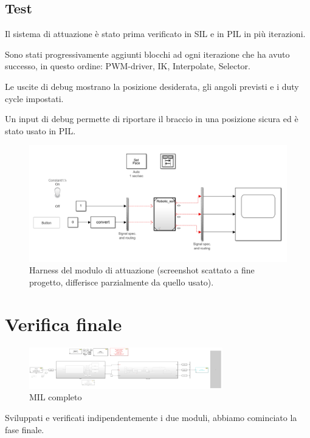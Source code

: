 \documentclass[12pt]{report}
\begin{document}
\section{Test}

Il sistema di attuazione è stato prima verificato in SIL e in PIL in più iterazioni.

Sono stati progressivamente aggiunti blocchi ad ogni iterazione che ha avuto successo, in questo ordine: PWM-driver, IK, Interpolate, Selector.

Le uscite di debug mostrano la posizione desiderata, gli angoli previsti e i duty cycle impostati.

Un input di debug permette di riportare il braccio in una posizione sicura ed è stato usato in PIL.

\begin{figure}
\includegraphics[width=\textwidth]{Harness}
\caption{Harness del modulo di attuazione (screenshot scattato a fine progetto, differisce parzialmente da quello usato).}
\end{figure}

\chapter{Verifica finale}

\begin{figure}[h] 
    \centering
    \includegraphics[width=0.75\textwidth]{Immagini_sensore/Matlab_completo.png}
    \caption{MIL completo}
\end{figure}

Sviluppati e verificati indipendentemente i due moduli, abbiamo cominciato la fase finale.
\end{document}
